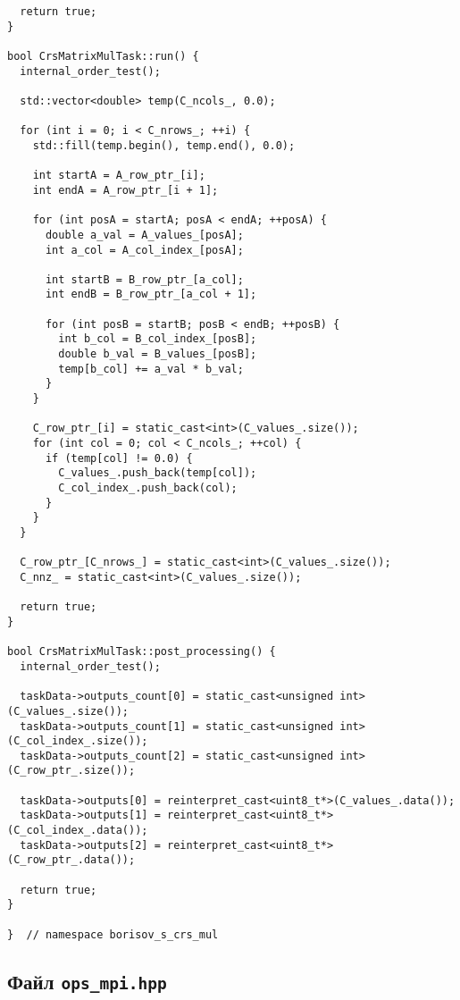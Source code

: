 \documentclass[12pt]{article}
\begin{document}
\begin{lstlisting}
  return true;
}

bool CrsMatrixMulTask::run() {
  internal_order_test();

  std::vector<double> temp(C_ncols_, 0.0);

  for (int i = 0; i < C_nrows_; ++i) {
    std::fill(temp.begin(), temp.end(), 0.0);

    int startA = A_row_ptr_[i];
    int endA = A_row_ptr_[i + 1];

    for (int posA = startA; posA < endA; ++posA) {
      double a_val = A_values_[posA];
      int a_col = A_col_index_[posA];

      int startB = B_row_ptr_[a_col];
      int endB = B_row_ptr_[a_col + 1];

      for (int posB = startB; posB < endB; ++posB) {
        int b_col = B_col_index_[posB];
        double b_val = B_values_[posB];
        temp[b_col] += a_val * b_val;
      }
    }

    C_row_ptr_[i] = static_cast<int>(C_values_.size());
    for (int col = 0; col < C_ncols_; ++col) {
      if (temp[col] != 0.0) {
        C_values_.push_back(temp[col]);
        C_col_index_.push_back(col);
      }
    }
  }

  C_row_ptr_[C_nrows_] = static_cast<int>(C_values_.size());
  C_nnz_ = static_cast<int>(C_values_.size());

  return true;
}

bool CrsMatrixMulTask::post_processing() {
  internal_order_test();

  taskData->outputs_count[0] = static_cast<unsigned int>(C_values_.size());
  taskData->outputs_count[1] = static_cast<unsigned int>(C_col_index_.size());
  taskData->outputs_count[2] = static_cast<unsigned int>(C_row_ptr_.size());

  taskData->outputs[0] = reinterpret_cast<uint8_t*>(C_values_.data());
  taskData->outputs[1] = reinterpret_cast<uint8_t*>(C_col_index_.data());
  taskData->outputs[2] = reinterpret_cast<uint8_t*>(C_row_ptr_.data());

  return true;
}

}  // namespace borisov_s_crs_mul
\end{lstlisting}

\subsection*{Файл \texttt{ops\_mpi.hpp}}
\end{document}
